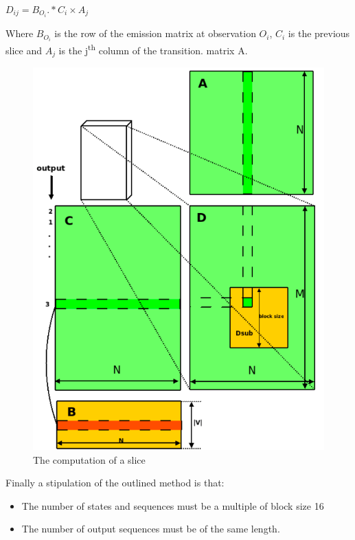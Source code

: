 \documentclass[english, paper=a4]{scrartcl}
\begin{document}
\begin{center}

\( D_{ij} = B_{O_i} .* C_i \times A_j \)

\end{center}

Where \( B_{O_i}\) is the row of the emission matrix at observation \(O_i\), \(C_i\) is the previous slice and \(A_j\) is the j\textsuperscript{th} column of the transition. matrix A.

\begin{figure}[H]
\centering

\includegraphics[scale=0.3]{"slice"}
  \caption{The computation of a slice\cite{cuhmm}}
\end{figure}

Finally a stipulation of the outlined method is that:

\begin{itemize}
\item The number of states and sequences must be a multiple of block size 16
\item The number of output sequences must be of the same length.
\end{itemize}
\end{document}
